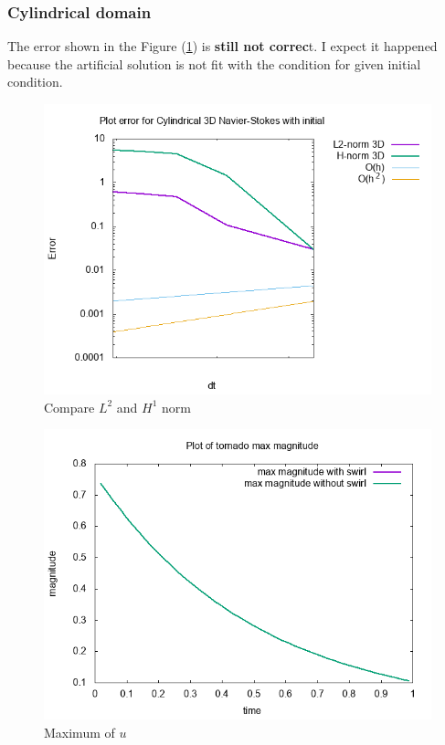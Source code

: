 \documentclass[a4paper]{article}
\begin{document}
\subsubsection{Cylindrical domain}
The error shown in the Figure (\ref{fig:errortornado}) is \textbf{still not correc}t. I expect it happened because the artificial solution is not fit with the condition for given initial condition.
\begin{figure}[h!]
	\centering
	\includegraphics[width=1\linewidth]{NS_3D/error_tornado}
	\caption{Compare $ L^{2} $ and $ H^{1} $ norm}
	\label{fig:errortornado}
\end{figure}
\begin{figure}[h!]
	\centering
	\includegraphics[width=1\linewidth]{NS_3D/magnitude_tornado}
	\caption{Maximum of $ u $ }
	\label{fig:magnitudetornado}
\end{figure}
\end{document}
